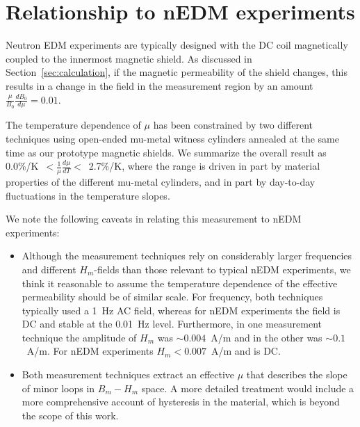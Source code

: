 





\section{Relationship to nEDM experiments\label{sec:relationship}}

Neutron EDM experiments are typically designed with the DC coil
magnetically coupled to the innermost magnetic shield. As discussed in
Section~\ref{sec:calculation}, if the magnetic permeability of the
shield changes, this results in a change in the field in the
measurement region by an amount
$\frac{\mu}{B_0}\frac{dB_0}{d\mu}=0.01$.

The temperature dependence of $\mu$ has been constrained by two
different techniques using open-ended mu-metal witness cylinders
annealed at the same time as our prototype magnetic shields.  We
summarize the overall result as
0.0\%/K~$<\frac{1}{\mu}\frac{d\mu}{dT}<$~2.7\%/K, where the range is
driven in part by material properties of the different mu-metal
cylinders, and in part by day-to-day fluctuations in the temperature
slopes.



We note the following caveats in relating this measurement to nEDM
experiments:
\begin{itemize}
\item Although the measurement techniques rely on considerably larger
  frequencies and different $H_m$-fields than those relevant to
  typical nEDM experiments, we think it reasonable to assume the
  temperature dependence of the effective permeability should be of
  similar scale.  For frequency, both techniques typically used a 1~Hz
  AC field, whereas for nEDM experiments the field is DC and stable at
  the 0.01~Hz level.  Furthermore, in one measurement technique the
  amplitude of $H_m$ was $\sim 0.004$~A/m and in the other was $\sim
  0.1$~A/m.  For nEDM experiments $H_m<0.007$~A/m and is DC.
\item Both measurement techniques extract an effective $\mu$ that
  describes the slope of minor loops in $B_m-H_m$ space.  A more
  detailed treatment would include a more comprehensive account of
  hysteresis in the material, which is beyond the scope of this work.
\end{itemize}

